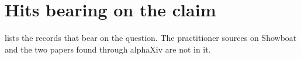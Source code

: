 \section{Hits bearing on the claim}
\label{sec:ai-rq4-hits}

 lists the records that bear on the question.
The practitioner sources on Showboat and the two papers found through alphaXiv
are not in it.

